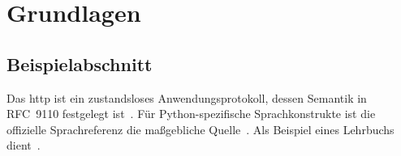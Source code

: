 \chapter{Grundlagen}
\label{cha:grundlagen}

\section{Beispielabschnitt}
\label{sec:grundlagen-beispiel}

Das \ac{http} ist ein zustandsloses Anwendungsprotokoll, dessen Semantik in
RFC~9110 festgelegt ist~\cite{rfc9110}. Für Python-spezifische Sprachkonstrukte
ist die offizielle Sprachreferenz die maßgebliche Quelle~\cite{python-reference}.
Als Beispiel eines Lehrbuchs dient~\cite{tanenbaum-betriebssysteme}.
